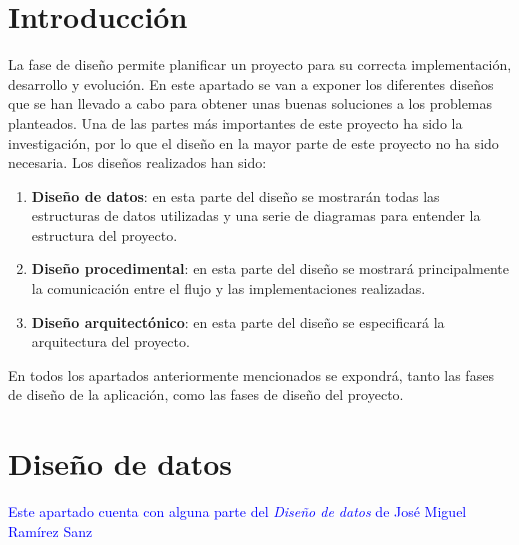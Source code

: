 
\section{Introducción}

La fase de diseño permite planificar un proyecto para su correcta implementación, desarrollo y evolución. En este apartado se van a exponer los diferentes diseños que se han llevado a cabo para obtener unas buenas soluciones a los problemas planteados. Una de las partes más importantes de este proyecto ha sido la investigación, por lo que el diseño en la mayor parte de este proyecto no ha sido necesaria. 
Los diseños realizados han sido:
\begin{enumerate}
    \item \textbf{Diseño de datos}: en esta parte del diseño se mostrarán todas las estructuras de datos utilizadas y una serie de diagramas para entender la estructura del proyecto. 
    \item \textbf{Diseño procedimental}: en esta parte del diseño se mostrará principalmente la comunicación entre el flujo y las implementaciones realizadas.
    \item \textbf{Diseño arquitectónico}: en esta parte del diseño se especificará la arquitectura del proyecto.
\end{enumerate}

En todos los apartados anteriormente mencionados se expondrá, tanto las fases de diseño de la aplicación, como las fases de diseño del proyecto.

\newpage
\section{Diseño de datos}
\textcolor{blue}{Este apartado cuenta con alguna parte del \textit{Diseño de datos} de José Miguel Ramírez Sanz}

